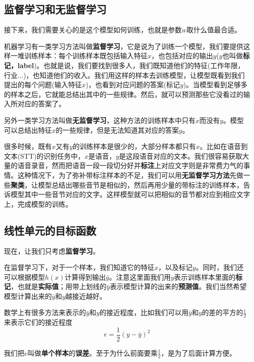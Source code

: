 \subsection{监督学习和无监督学习}\label{Line:3}

接下来，我们需要关心的是这个模型如何训练，也就是参数\(w\)取什么值最合适。

机器学习有一类学习方法叫做\textbf{监督学习}，它是说为了训练一个模型，我们要提供这样一堆训练样本：每个训练样本既包括输入特征\(x\)，也包括对应的输出\(y\)(\(y\)也叫做\textbf{标记，label})。也就是说，我们要找到很多人，我们既知道他们的特征(工作年限，行业...)，也知道他们的收入。我们用这样的样本去训练模型，让模型既看到我们提出的每个问题(输入特征\(x\))，也看到对应问题的答案(标记\(y\))。当模型看到足够多的样本之后，它就能总结出其中的一些规律。然后，就可以预测那些它没看过的输入所对应的答案了。

另外一类学习方法叫做\textbf{无监督学习}，这种方法的训练样本中只有\(x\)而没有\(y\)。模型可以总结出特征\(x\)的一些规律，但是无法知道其对应的答案\(y\)。

很多时候，既有\(x\)又有\(y\)的训练样本是很少的，大部分样本都只有\(x\)。比如在语音到文本(STT)的识别任务中，\(x\)是语音，\(y\)是这段语音对应的文本。我们很容易获取大量的语音录音，然而把语音一段一段切分好并\textbf{标注}上对应文字则是非常费力气的事情。这种情况下，为了弥补带标注样本的不足，我们可以用\textbf{无监督学习方法}先做一些\textbf{聚类}，让模型总结出哪些音节是相似的，然后再用少量的带标注的训练样本，告诉模型其中一些音节对应的文字。这样模型就可以把相似的音节都对应到相应文字上，完成模型的训练。

\subsection{线性单元的目标函数}\label{Line:4}

现在，让我们只考虑\textbf{监督学习}。

在监督学习下，对于一个样本，我们知道它的特征\(x\)，以及标记\(y\)。同时，我们还可以根据模型\(h(x)\)计算得到输出\(\bar{y}\)。注意这里面我们用\(y\)表示训练样本里面的\textbf{标记}，也就是\textbf{实际值}；用带上划线的\(\bar{y}\)表示模型计算的出来的\textbf{预测值}。我们当然希望模型计算出来的\(\bar{y}\)和\(y\)越接近越好。

数学上有很多方法来表示的\(\bar{y}\)和\(y\)的接近程度，比如我们可以用\(\bar{y}\)和\(y\)的差的平方的\(\frac{1}{2}\)来表示它们的接近程度
\[
	e=\frac{1}{2}(y-\bar{y})^2
\]

我们把\(e\)叫做\textbf{单个样本}的\textbf{误差}。至于为什么前面要乘\(\frac{1}{2}\)，是为了后面计算方便。

